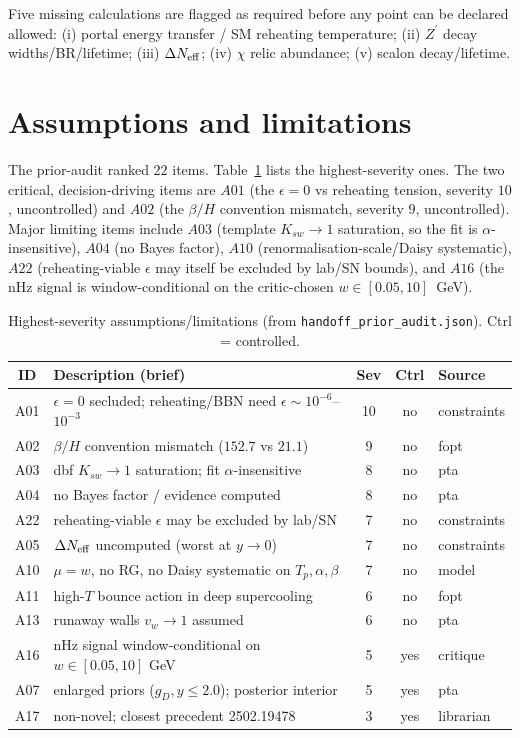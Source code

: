\documentclass[11pt]{article}
\newcommand{\Zp}{Z^{\prime}}
\newcommand{\gD}{g_{D}}
\newcommand{\betaH}{\beta/H}
\begin{document}
Five missing calculations are flagged as required before any point can be declared allowed:
(i) portal energy transfer / SM reheating temperature; (ii) $\Zp$ decay widths/BR/lifetime;
(iii) $\Delta N_{\rm eff}$; (iv) $\chi$ relic abundance; (v) scalon decay/lifetime.

\section{Assumptions and limitations}
\label{sec:assumptions}
The prior-audit ranked $22$ items. Table~\ref{tab:assump} lists the highest-severity ones.
The two critical, decision-driving items are $A01$ (the $\epsilon=0$ vs reheating tension,
severity $10$, uncontrolled) and $A02$ (the $\betaH$ convention mismatch, severity $9$,
uncontrolled). Major limiting items include $A03$ (template $K_{sw}\to1$ saturation, so the
fit is $\alpha$-insensitive), $A04$ (no Bayes factor), $A10$ (renormalisation-scale/Daisy
systematic), $A22$ (reheating-viable $\epsilon$ may itself be excluded by lab/SN bounds),
and $A16$ (the nHz signal is window-conditional on the critic-chosen $w\in[0.05,10]$~GeV).

\begin{table}[h]
\centering
\small
\caption{Highest-severity assumptions/limitations (from \texttt{handoff\_prior\_audit.json}).
Ctrl = controlled.}
\label{tab:assump}
\begin{tabular}{clccl}
\toprule
ID & Description (brief) & Sev & Ctrl & Source \\
\midrule
A01 & $\epsilon=0$ secluded; reheating/BBN need $\epsilon\sim10^{-6}$--$10^{-3}$ & 10 & no & constraints \\
A02 & $\betaH$ convention mismatch ($152.7$ vs $21.1$) & 9 & no & fopt \\
A03 & dbf $K_{sw}\to1$ saturation; fit $\alpha$-insensitive & 8 & no & pta \\
A04 & no Bayes factor / evidence computed & 8 & no & pta \\
A22 & reheating-viable $\epsilon$ may be excluded by lab/SN & 7 & no & constraints \\
A05 & $\Delta N_{\rm eff}$ uncomputed (worst at $y{\to}0$) & 7 & no & constraints \\
A10 & $\mu=w$, no RG, no Daisy systematic on $T_p,\alpha,\beta$ & 7 & no & model \\
A11 & high-$T$ bounce action in deep supercooling & 6 & no & fopt \\
A13 & runaway walls $v_w\to1$ assumed & 6 & no & pta \\
A16 & nHz signal window-conditional on $w\in[0.05,10]$ GeV & 5 & yes & critique \\
A07 & enlarged priors ($\gD,y\le2.0$); posterior interior & 5 & yes & pta \\
A17 & non-novel; closest precedent 2502.19478 & 3 & yes & librarian \\
\bottomrule
\end{tabular}
\end{table}
\end{document}
